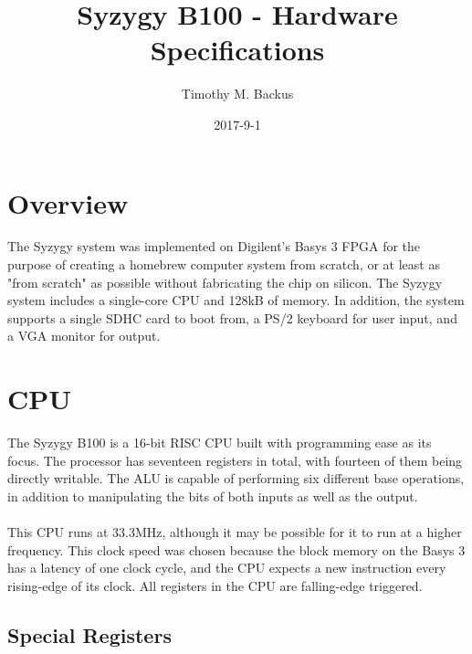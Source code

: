 \documentclass{article}
\title{\textbf{Syzygy B100 - Hardware Specifications}}
\date{2017-9-1}
\author{Timothy M. Backus}
\begin{document}

	\maketitle

	\newpage

	\tableofcontents

	\pagebreak

	\section{Overview}

	The Syzygy system was implemented on Digilent's Basys 3 FPGA for the purpose of creating a homebrew computer system from scratch, or at least as "from scratch" as possible without fabricating the chip on silicon. The Syzygy system includes a single-core CPU and 128kB of memory. In addition, the system supports a single SDHC card to boot from, a PS/2 keyboard for user input, and a VGA monitor for output.

	\section{CPU}

	The Syzygy B100 is a 16-bit RISC CPU built with programming ease as its focus. The processor has seventeen registers in total, with fourteen of them being directly writable. The ALU is capable of performing six different base operations, in addition to manipulating the bits of both inputs as well as the output.\\
	\\
	This CPU runs at 33.3MHz, although it may be possible for it to run at a higher frequency. This clock speed was chosen because the block memory on the Basys 3 has a latency of one clock cycle, and the CPU expects a new instruction every rising-edge of its clock. All registers in the CPU are falling-edge triggered.

		\subsection{Special Registers}
	
\end{document}
